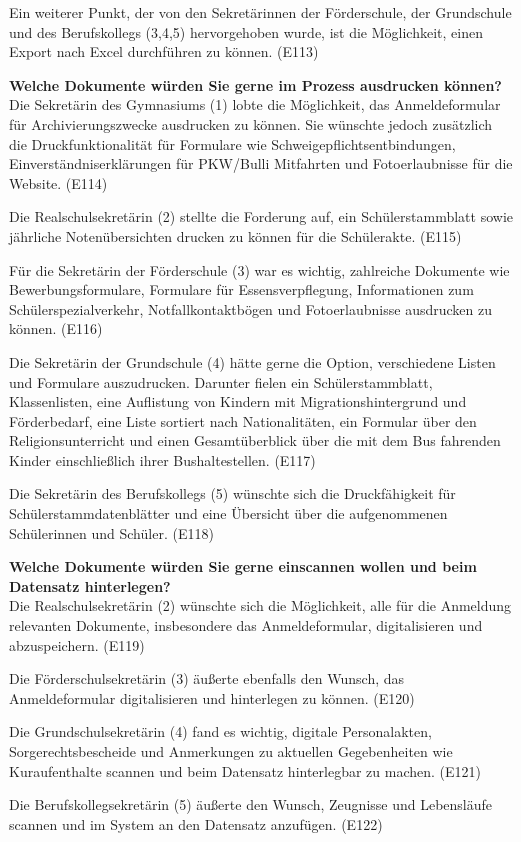 Ein weiterer Punkt, der von den Sekretärinnen der Förderschule, der Grundschule und des Berufskollegs (3,4,5) hervorgehoben wurde, ist die Möglichkeit, einen Export nach Excel durchführen zu können. (E113)

\textbf{Welche Dokumente würden Sie gerne im Prozess ausdrucken können?}\\
Die Sekretärin des Gymnasiums (1) lobte die Möglichkeit, das Anmeldeformular für Archivierungszwecke ausdrucken zu können. Sie wünschte jedoch zusätzlich die Druckfunktionalität für Formulare wie Schweigepflichtsentbindungen, Einverständniserklärungen für PKW/Bulli Mitfahrten und Fotoerlaubnisse für die Website. (E114)

Die Realschulsekretärin (2) stellte die Forderung auf, ein Schülerstammblatt sowie jährliche Notenübersichten drucken zu können für die Schülerakte. (E115)

Für die Sekretärin der Förderschule (3) war es wichtig, zahlreiche Dokumente wie Bewerbungsformulare, Formulare für Essensverpflegung, Informationen zum Schülerspezialverkehr, Notfallkontaktbögen und Fotoerlaubnisse ausdrucken zu können. (E116)

Die Sekretärin der Grundschule (4) hätte gerne die Option, verschiedene Listen und Formulare auszudrucken. Darunter fielen ein Schülerstammblatt, Klassenlisten, eine Auflistung von Kindern mit Migrationshintergrund und Förderbedarf, eine Liste sortiert nach Nationalitäten, ein Formular über den Religionsunterricht und einen Gesamtüberblick über die mit dem Bus fahrenden Kinder einschließlich ihrer Bushaltestellen. (E117)

Die Sekretärin des Berufskollegs (5) wünschte sich die Druckfähigkeit für Schülerstammdatenblätter und eine Übersicht über die aufgenommenen Schülerinnen und Schüler. (E118)

\textbf{Welche Dokumente würden Sie gerne einscannen wollen und beim Datensatz hinterlegen?}\\
Die Realschulsekretärin (2) wünschte sich die Möglichkeit, alle für die Anmeldung relevanten Dokumente, insbesondere das Anmeldeformular, digitalisieren und abzuspeichern. (E119)

Die Förderschulsekretärin (3) äußerte ebenfalls den Wunsch, das Anmeldeformular digitalisieren und hinterlegen zu können. (E120)

Die Grundschulsekretärin (4) fand es wichtig, digitale Personalakten, Sorgerechtsbescheide und Anmerkungen zu aktuellen Gegebenheiten wie Kuraufenthalte scannen und beim Datensatz hinterlegbar zu machen. (E121)

Die Berufskollegsekretärin (5) äußerte den Wunsch, Zeugnisse und Lebensläufe scannen und im System an den Datensatz anzufügen. (E122)